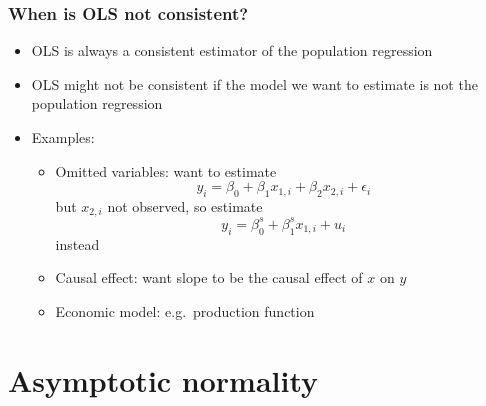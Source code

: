 \begin{frame}\frametitle{When is OLS not consistent?}
  \begin{itemize}
  \item OLS is always a consistent estimator of the population
    regression
  \item OLS might not be consistent if the model we want to estimate
    is not the population regression
  \item Examples:
    \begin{itemize}
    \item Omitted variables: want to estimate
      \[ y_i = \beta_0 + \beta_1 x_{1,i} + \beta_2 x_{2,i} +
      \epsilon_i \]
      but $x_{2,i}$ not observed, so estimate
      \[ y_i = \beta_0^s + \beta_1^s x_{1,i} + u_i \]
      instead
    \item Causal effect: want slope to be the causal effect of $x$ on
      $y$ 
    \item Economic model: e.g.\ production function
    \end{itemize}
  \end{itemize}
\end{frame}

\section{Asymptotic normality}

